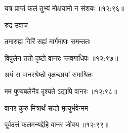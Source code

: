 
{\devanagarifont यत्र प्राप्तं फलं तुभ्यं मोक्षयामो न संशयः {॥१२:९६॥} \veg\dontdisplaylinenum }%

{\devanagarifont रुद्र उवाच {\dandab}\dontdisplaylinenum  }%
 
{\devanagarifont तमारुह्य गिरिं सह्यं मार्गमाणः समन्ततः \thinspace{\danda} \dontdisplaylinenum }%


{\devanagarifont विपुलेन ततो दृष्टो वानरः प्लवगाधिपः {॥१२:९७॥} \veg\dontdisplaylinenum }%

{\devanagarifont अयं स वानरश्रेष्ठो वृक्षच्छायां समाश्रितः \thinspace{\dandab} \dontdisplaylinenum }%


{\devanagarifont मम पुण्यबलेनैव दृश्यते ऽद्यापि वानरः {॥१२:९८॥} \veg\dontdisplaylinenum }%
 
{\devanagarifont वानर कुरु मित्रार्थं सद्यो मृत्युर्भवेन्मम \thinspace{\dandab} \dontdisplaylinenum }%


{\devanagarifont पूर्वदत्तं फलमन्यद्देहि वानर जीवय {॥१२:९९॥} \veg\dontdisplaylinenum }%

